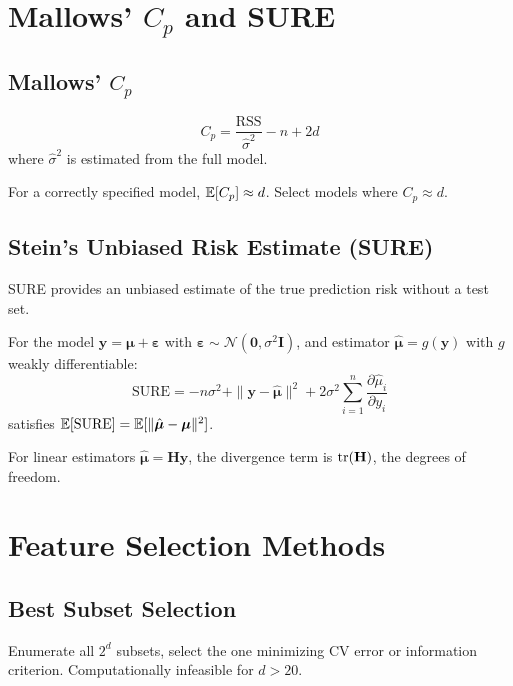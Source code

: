 \documentclass[main.tex]{subfiles}
\begin{document}
\needspace{0.33\textheight}
\section{Mallows' $C_p$ and SURE}

\subsection{Mallows' $C_p$}

\begin{definition}[Mallows' $C_p$]
$$C_p = \frac{\text{RSS}}{\hat{\sigma}^2} - n + 2d$$
where $\hat{\sigma}^2$ is estimated from the full model.
\end{definition}

For a correctly specified model, $\mathbb{E}[C_p] \approx d$. Select models where $C_p \approx d$.

\subsection{Stein's Unbiased Risk Estimate (SURE)}

SURE provides an unbiased estimate of the true prediction risk without a test set.

\begin{theorem}[SURE]
For the model $\mathbf{y} = \boldsymbol{\mu} + \boldsymbol{\varepsilon}$ with $\boldsymbol{\varepsilon} \sim \mathcal{N}(\mathbf{0}, \sigma^2\mathbf{I})$, and estimator $\hat{\boldsymbol{\mu}} = g(\mathbf{y})$ with $g$ weakly differentiable:
$$\text{SURE} = -n\sigma^2 + \|\mathbf{y} - \hat{\boldsymbol{\mu}}\|^2 + 2\sigma^2 \sum_{i=1}^{n}\frac{\partial \hat{\mu}_i}{\partial y_i}$$
satisfies $\mathbb{E}[\text{SURE}] = \mathbb{E}[\|\hat{\boldsymbol{\mu}} - \boldsymbol{\mu}\|^2]$.
\end{theorem}

For linear estimators $\hat{\boldsymbol{\mu}} = \mathbf{H}\mathbf{y}$, the divergence term is $\text{tr}(\mathbf{H})$, the degrees of freedom.

\needspace{0.33\textheight}
\section{Feature Selection Methods}

\subsection{Best Subset Selection}

Enumerate all $2^d$ subsets, select the one minimizing CV error or information criterion. Computationally infeasible for $d > 20$.
\end{document}

